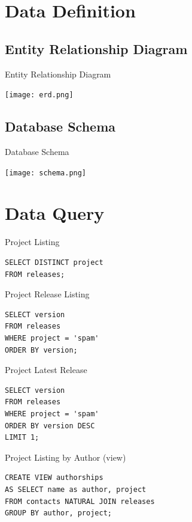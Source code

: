 \documentclass[pdf]{beamer}
\begin{document}
\section{Data Definition}
\frame{\tableofcontents[currentsection]}
\subsection{Entity Relationship Diagram}
\begin{frame}{Entity Relationship Diagram}
  \begin{center}
    \texttt{[image: erd.png]}
  \end{center}
\end{frame}

\subsection{Database Schema}
\begin{frame}{Database Schema}
  \begin{center}
    \texttt{[image: schema.png]}
  \end{center}
\end{frame}

\section{Data Query}
\frame{\tableofcontents[currentsection]}
\begin{frame}[fragile]{Project Listing}\huge
\begin{verbatim}
SELECT DISTINCT project
FROM releases;
\end{verbatim}
\end{frame}

\begin{frame}[fragile]{Project Release Listing}\LARGE
\begin{verbatim}
SELECT version
FROM releases
WHERE project = 'spam'
ORDER BY version;
\end{verbatim}
\end{frame}

\begin{frame}[fragile]{Project Latest Release}\LARGE
\begin{verbatim}
SELECT version
FROM releases
WHERE project = 'spam'
ORDER BY version DESC
LIMIT 1;
\end{verbatim}
\end{frame}

\begin{frame}[fragile]{Project Listing by Author (view)}\Large
\begin{verbatim}
CREATE VIEW authorships
AS SELECT name as author, project
FROM contacts NATURAL JOIN releases
GROUP BY author, project;
\end{verbatim}
\end{frame}
\end{document}
